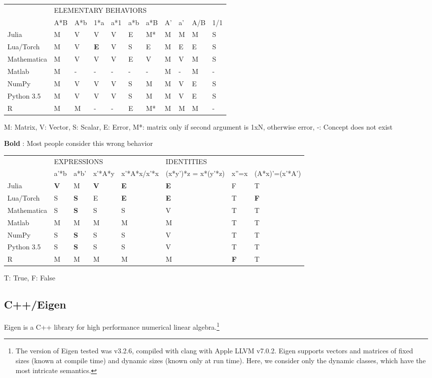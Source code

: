 \begin{tabular}{|l|l|l|l|l|l|l|l|l|l|l|}
\cline{2-11}
\multicolumn{1}{l|}{} & \multicolumn{10}{l|}{ELEMENTARY BEHAVIORS}\tabularnewline
\cline{2-11}
\multicolumn{1}{l|}{} & A{*}B & A{*}b & 1{*}a & a{*}1 & a{*}b & a{*}B & A' & a' & A/B & 1/1\tabularnewline
\midrule
Julia & M & V & V & V & E & M{*} & M & M & M & S\tabularnewline
\midrule
Lua/Torch & M & V & \textbf{E} & V & S & E & M & E & E & S\tabularnewline
\midrule
Mathematica & M & V & V & V & E & V & M & V & M & S\tabularnewline
\midrule
Matlab & M & - & - & - & - & - & M & - & M & -\tabularnewline
\midrule
NumPy & M & V & V & V & S & M & M & V & E & S\tabularnewline
\midrule
Python 3.5 & M & V & V & V & S & M & M & V & E & S\tabularnewline
\midrule
R & M & M & - & - & E & M{*} & M & M & M & -\tabularnewline
\midrule
\end{tabular}

M: Matrix, V: Vector, S: Scalar, E: Error, M{*}: matrix only if second
argument is 1xN, otherwise error, -: Concept does not exist

\textbf{Bold} : Most people consider this wrong behavior

\begin{tabular}{|l|l|l|l|l|l|l|l|}
\cline{2-8}
\multicolumn{1}{l|}{} & \multicolumn{4}{l|}{EXPRESSIONS} & \multicolumn{3}{l|}{IDENTITIES}\tabularnewline
\cline{2-8}
\multicolumn{1}{l|}{} & a'{*}b & a{*}b' & x'{*}A{*}y & x'{*}A{*}x/x'{*}x & (x{*}y'){*}z = x{*}(y'{*}z) & x''=x & (A{*}x)'=(x'{*}A')\tabularnewline
\midrule
Julia & \textbf{V} & M & \textbf{V} & \textbf{E} & \textbf{E} & F & T\tabularnewline
\midrule
Lua/Torch & S & \textbf{S} & E & \textbf{E} & \textbf{E} & T & \textbf{F}\tabularnewline
\midrule
Mathematica & S & \textbf{S} & S & S & V & T & T\tabularnewline
\midrule
Matlab & M & M & M & M & M & T & T\tabularnewline
\midrule
NumPy & S & \textbf{S} & S & S & V & T & T\tabularnewline
\midrule
Python 3.5 & S & \textbf{S} & S & S & V & T & T\tabularnewline
\midrule
R & M & M & M & M & M & \textbf{F} & T\tabularnewline
\midrule
\end{tabular}

T: True, F: False



\subsection{C++/Eigen}

Eigen is a C++ library for high performance numerical linear
algebra.\cite{eigenweb}\footnote{The version of Eigen tested was v3.2.6,
compiled with clang with Apple LLVM v7.0.2. Eigen supports vectors and
matrices of fixed sizes (known at compile time) and dynamic sizes (known only
at run time). Here, we consider only the dynamic classes, which have
the most intricate semantics.
}

